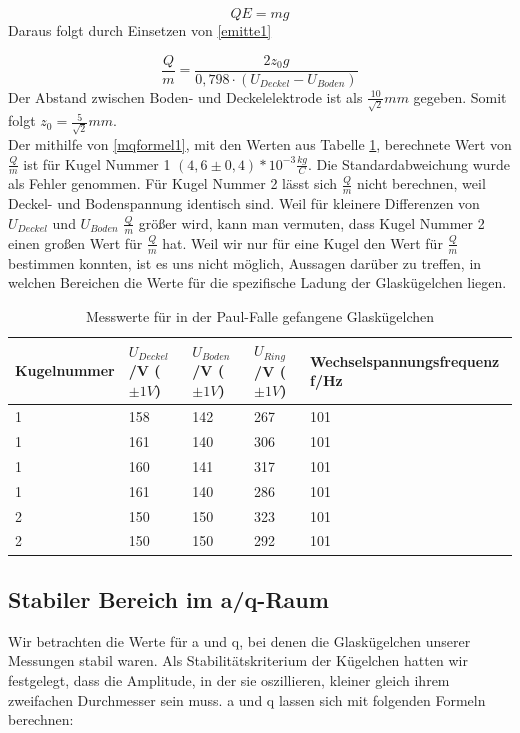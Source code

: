 \documentclass[10pt,a4paper]{article}
\begin{document}
\begin{equation}
	Q E = m g
\end{equation}
Daraus folgt durch Einsetzen von \eqref{emitte1}

\begin{equation}
	\frac{Q}{m} = \frac{2 z_0 g}{0,798 \cdot(U_{Deckel} - U_{Boden})}
	\label{mqformel1}
\end{equation}
Der Abstand zwischen Boden- und Deckelelektrode ist als $\frac{10}{\sqrt{2}}mm$ gegeben. Somit folgt $z_0 = \frac{5}{\sqrt{2}}mm$.\\Der mithilfe von \eqref{mqformel1}, mit den Werten aus Tabelle \ref{gefangen}, berechnete Wert von $\frac{Q}{m}$ ist für Kugel Nummer 1 $(4,6 \pm 0,4)*10^{-3} \frac{kg}{C}$. Die Standardabweichung wurde als Fehler genommen. Für Kugel Nummer 2 lässt sich $\frac{Q}{m}$ nicht berechnen, weil Deckel- und Bodenspannung identisch sind. Weil für kleinere Differenzen von $U_{Deckel}$ und $U_{Boden}$ $\frac{Q}{m}$ größer wird, kann man vermuten, dass Kugel Nummer 2 einen großen Wert für $\frac{Q}{m}$ hat. Weil wir nur für eine Kugel den Wert für $\frac{Q}{m}$ bestimmen konnten, ist es uns nicht möglich, Aussagen darüber zu treffen, in welchen Bereichen die Werte für die spezifische Ladung der Glaskügelchen liegen.

\begin{table}[h!]
	\centering
	\begin{tabular}{|l|l|l|l|l|}\hline
		Kugelnummer & $U_{Deckel}$/V ($\pm 1V$)& $U_{Boden}$/V ($\pm 1V$)& $U_{Ring}$/V ($\pm 1V$)& Wechselspannungsfrequenz f/Hz\\\hline
		1 & 158 & 142 & 267 & 101\\
		1 & 161 & 140 & 306 & 101\\
		1 & 160 & 141 & 317 & 101\\
		1 & 161 & 140 & 286 & 101\\
		2 & 150 & 150 & 323 & 101\\
		2 & 150 & 150 & 292 & 101\\\hline
	\end{tabular}
	\caption{Messwerte für in der Paul-Falle gefangene Glaskügelchen}
	\label{gefangen}
\end{table}

\subsection{Stabiler Bereich im a/q-Raum}
Wir betrachten die Werte für a und q, bei denen die Glaskügelchen unserer Messungen stabil waren. Als Stabilitätskriterium der Kügelchen hatten wir festgelegt, dass die Amplitude, in der sie oszillieren, kleiner gleich ihrem zweifachen Durchmesser sein muss. a und q lassen sich mit folgenden Formeln berechnen:
\end{document}
